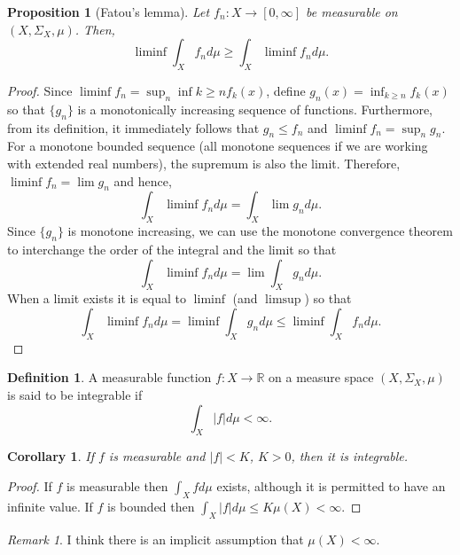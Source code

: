 \documentclass{article}
\newcommand{\sor}{\mathbb{R}}
\theoremstyle{plain}
\numberwithin{thm}{section}
\theoremstyle{plain}
\newtheorem{prop}{Proposition}
\numberwithin{prop}{section}
\theoremstyle{definition}
\newtheorem{defn}{Definition}
\numberwithin{defn}{section}
\theoremstyle{remark}
\newtheorem*{rem}{Remark}
\theoremstyle{plain}
\newtheorem{cor}{Corollary}
\numberwithin{cor}{section}
\numberwithin{equation}{section}
\begin{document}
\begin{prop}[Fatou's lemma] Let $f_n: X \rightarrow [0, \infty]$ be measurable
on $(X, \Sigma_X, \mu)$. Then,
\[
\liminf\int_X f_n d\mu \ge \int_X\liminf f_n d\mu.
\]
\end{prop}
\begin{proof}
Since $\liminf f_n = \sup_n\inf{k \ge n} f_k(x)$, define $g_n(x) = \inf_{k \ge n}
f_k(x)$ so that $\{g_n\}$ is a monotonically increasing sequence of functions. 
Furthermore, from its definition, it immediately follows that $g_n \le f_n$ and
$\liminf f_n = \sup_n g_n$. For a monotone bounded sequence (all monotone sequences
if we are working with extended real numbers), the supremum is also the limit.
Therefore, $\liminf f_n = \lim g_n$ and hence,
\[
\int_X\liminf f_n d\mu = \int_X\lim g_n d\mu.
\]
Since $\{g_n\}$ is monotone increasing, we can use the monotone convergence theorem
to interchange the order of the integral and the limit so that
\[
\int_X\liminf f_n d\mu = \lim\int_X g_n d\mu.
\]
When a limit exists it is equal to $\liminf$ (and $\limsup$) so that
\[
\int_X\liminf f_n d\mu = \liminf\int_X g_n d\mu \le \liminf\int_X f_n d\mu.
\]
\end{proof}

\begin{defn}\label{s4d1}
A measurable function $f: X \rightarrow \sor$ on a measure space $(X, \Sigma_X, \mu)$
is said to be integrable if
\[
\int_X|f|d\mu < \infty.
\]
\end{defn}

\begin{cor}\label{s4c2}
If $f$ is measurable and $|f| < K$, $K > 0$, then it is integrable.
\end{cor}
\begin{proof}
If $f$ is measurable then $\int_X fd\mu$ exists, although it is permitted to have
an infinite value. If $f$ is bounded then $\int_X |f| d\mu \le K\mu(X) < \infty$.
\end{proof}
\begin{rem}
I think there is an implicit assumption that $\mu(X) < \infty$.
\end{rem}
\end{document}
